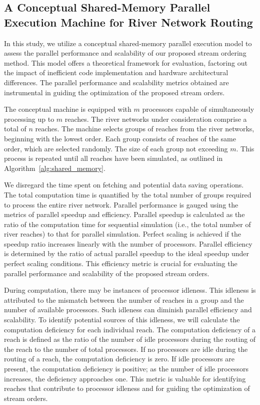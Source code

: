 \documentclass[water,article,submit,pdftex,moreauthors]{Definitions/mdpi}
\begin{document}
\subsection{A Conceptual Shared-Memory Parallel Execution Machine for River Network Routing}
\label{sec:parallel_machine}

In this study, we utilize a conceptual shared-memory parallel execution model to assess the parallel performance and scalability of our proposed stream ordering method. This model offers a theoretical framework for evaluation, factoring out the impact of inefficient code implementation and hardware architectural differences. The parallel performance and scalability metrics obtained are instrumental in guiding the optimization of the proposed stream orders.

The conceptual machine is equipped with $m$ processors capable of simultaneously processing up to $m$ reaches. The river networks under consideration comprise a total of $n$ reaches. The machine selects groups of reaches from the river networks, beginning with the lowest order. Each group consists of reaches of the same order, which are selected randomly. The size of each group not exceeding $m$. This process is repeated until all reaches have been simulated, as outlined in Algorithm~\ref{alg:shared_memory}.

We disregard the time spent on fetching and potential data saving operations. The total computation time is quantified by the total number of groups required to process the entire river network. Parallel performance is gauged using the metrics of parallel speedup and efficiency. Parallel speedup is calculated as the ratio of the computation time for sequential simulation (i.e., the total number of river reaches) to that for parallel simulation. Perfect scaling is achieved if the speedup ratio increases linearly with the number of processors. Parallel efficiency is determined by the ratio of actual parallel speedup to the ideal speedup under perfect scaling conditions. This efficiency metric is crucial for evaluating the parallel performance and scalability of the proposed stream orders.

During computation, there may be instances of processor idleness. This idleness is attributed to the mismatch between the number of reaches in a group and the number of available processors. Such idleness can diminish parallel efficiency and scalability. To identify potential sources of this idleness, we will calculate the computation deficiency for each individual reach. The computation deficiency of a reach is defined as the ratio of the number of idle processors during the routing of the reach to the number of total processors. If no processors are idle during the routing of a reach, the computation deficiency is zero. If idle processors are present, the computation deficiency is positive; as the number of idle processors increases, the deficiency approaches one. This metric is valuable for identifying reaches that contribute to processor idleness and for guiding the optimization of stream orders.
\end{document}
